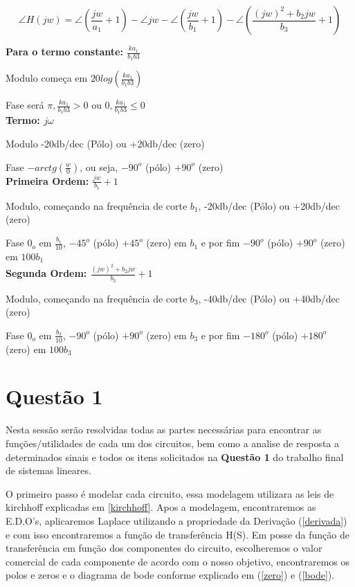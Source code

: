 \documentclass[a4paper, 12pt]{article}
\begin{document}
		\[
		\angle H(jw) = \angle (\frac{jw}{a_{1}}+1) - \angle jw - \angle (\frac{jw}{b_{1}}+1) - \angle (\frac{(jw)^{2} + b_{2}jw}{b_{3}}+1)
		\]

		\textbf{Para o termo constante: $\frac{ka_{1}}{b_{1}b{3}}$}

		Modulo começa em $20log(\frac{ka_{1}}{b_{1}b{3}})$

		Fase será $\pi, \frac{ka_{1}}{b_{1}b{3}} > 0$ ou $0, \frac{ka_{1}}{b_{1}b{3}} \leq 0$\\

		\textbf{Termo: $j\omega$}

		Modulo -20db/dec (Pólo) ou +20db/dec (zero)

		Fase $-arctg(\frac{w}{0})$, ou seja, $-90^{o}$ (pólo) $+90^{o}$ (zero)\\

		\textbf{Primeira Ordem: $\frac{jw}{b_{1}}+1$}

		Modulo, começando na frequência de corte $b_{1}$, -20db/dec (Pólo) ou +20db/dec (zero)

		Fase $0_{o}$ em $\frac{b_{1}}{10}$, $-45^{o}$ (pólo) $+45^{o}$ (zero) em $b_{1}$ e por fim $-90^{o}$ (pólo) $+90^{o}$ (zero) em $100b_{1}$\\

		\textbf{Segunda Ordem: $\frac{(jw)^{2} + b_{2}jw}{b_{3}}+1$}

		Modulo, começando na frequência de corte $b_{3}$, -40db/dec (Pólo) ou +40db/dec (zero)

		Fase $0_{o}$ em $\frac{b_{3}}{10}$, $-90^{o}$ (pólo) $+90^{o}$ (zero) em $b_{3}$ e por fim $-180^{o}$ (pólo) $+180^{o}$ (zero) em $100b_{3}$\\
	\newpage
	\section{Quest\~{a}o 1}
		Nesta sessão serão resolvidas todas as partes necessárias para encontrar as funções/utilidades de cada um dos circuitos, bem como a analise de resposta a determinados sinais e todos os itens solicitados na \textbf{Questão 1} do trabalho final de sistemas lineares.

		O primeiro passo é modelar cada circuito, essa modelagem utilizara as leis de kirchhoff explicadas em \ref{kirchhoff}. Apos a modelagem, encontraremos as E.D.O's, aplicaremos Laplace utilizando a propriedade da Derivação (\ref{derivada}) e com isso encontraremos a função de transferência H(S). Em posse da função de transferência em função dos componentes do circuito, escolheremos o valor comercial de cada componente de acordo com o nosso objetivo, encontraremos os polos e zeros e o diagrama de bode conforme explicado em (\ref{zero}) e (\ref{bode}).
\end{document}
